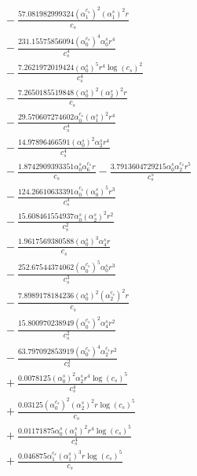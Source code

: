 \documentclass[10pt]{article}
\begin{document}
\begin{align*}
&{}  - \frac{57.081982999324 \left(\alpha_{1}^{c_s}\right)^{2} \left(\alpha_{1}^s\right)^{2} r}{c_{s}} \\
&{}  - \frac{231.15575856094 \left(\alpha_{0}^{c_s}\right)^{4} \alpha_{0}^s r^{4}}{c_{s}^{4}} \\
&{}  - \frac{7.2621972019424 \left(\alpha_{0}^s\right)^{5} r^{4} \log{\left(c_{s} \right)}^{2}}{c_{s}^{4}} \\
&{}  - \frac{7.2650185519848 \left(\alpha_{0}^s\right)^{2} \left(\alpha_{2}^s\right)^{2} r}{c_{s}} \\
&{}  - \frac{29.570607274602 \alpha_{0}^{c_s} \left(\alpha_{1}^s\right)^{2} r^{4}}{c_{s}^{4}} \\
&{}  - \frac{14.97896466591 \left(\alpha_{0}^s\right)^{2} \alpha_{2}^s r^{4}}{c_{s}^{4}} \\
&{}  - \frac{1.8742909393351 \alpha_{0}^s \alpha_{6}^{c_s} r}{c_{s}} - \frac{3.7913604729215 \alpha_{0}^s \alpha_{2}^{c_s} r^{5}}{c_{s}^{5}} \\
&{}  - \frac{124.26610633391 \alpha_{0}^{c_s} \left(\alpha_{0}^s\right)^{5} r^{3}}{c_{s}^{3}} \\
&{}  - \frac{15.608461554937 \alpha_{0}^s \left(\alpha_{2}^s\right)^{2} r^{2}}{c_{s}^{2}} \\
&{}  - \frac{1.9617569380588 \left(\alpha_{0}^s\right)^{3} \alpha_{4}^s r}{c_{s}} \\
&{}  - \frac{252.67544374062 \left(\alpha_{0}^{c_s}\right)^{5} \alpha_{0}^s r^{3}}{c_{s}^{3}} \\
&{}  - \frac{7.8989178184236 \left(\alpha_{0}^s\right)^{2} \left(\alpha_{2}^{c_s}\right)^{2} r}{c_{s}} \\
&{}  - \frac{15.800970238949 \left(\alpha_{0}^{c_s}\right)^{2} \alpha_{4}^s r^{2}}{c_{s}^{2}} \\
&{}  - \frac{63.797092853919 \left(\alpha_{0}^{c_s}\right)^{4} \alpha_{2}^{c_s} r^{2}}{c_{s}^{2}} \\
&{}  + \frac{0.0078125 \left(\alpha_{0}^s\right)^{2} \alpha_{2}^s r^{4} \log{\left(c_{s} \right)}^{5}}{c_{s}^{4}} \\
&{}  + \frac{0.03125 \left(\alpha_{0}^{c_s}\right)^{2} \left(\alpha_{2}^s\right)^{2} r \log{\left(c_{s} \right)}^{5}}{c_{s}} \\
&{}  + \frac{0.01171875 \alpha_{0}^s \left(\alpha_{1}^s\right)^{2} r^{4} \log{\left(c_{s} \right)}^{5}}{c_{s}^{4}} \\
&{}  + \frac{0.046875 \alpha_{1}^{c_s} \left(\alpha_{1}^s\right)^{3} r \log{\left(c_{s} \right)}^{5}}{c_{s}} \\

\end{align*}
\end{document}
